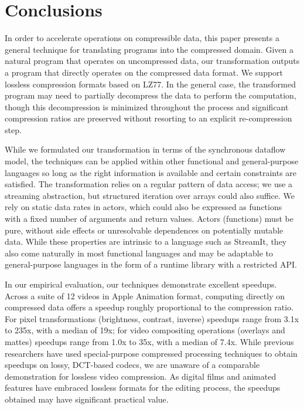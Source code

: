 \section{Conclusions}
\label{sec:conclusions}


In order to accelerate operations on compressible data, this paper
presents a general technique for translating programs into the
compressed domain.  Given a natural program that operates on
uncompressed data, our transformation outputs a program that directly
operates on the compressed data format.  We support lossless
compression formats based on LZ77.  In the general case, the
transformed program may need to partially decompress the data to
perform the computation, though this decompression is minimized
throughout the process and significant compression ratios are
preserved without resorting to an explicit re-compression step.

While we formulated our transformation in terms of the synchronous
dataflow model, the techniques can be applied within other functional
and general-purpose languages so long as the right information is
available and certain constraints are satisfied.  The transformation
relies on a regular pattern of data access; we use a streaming
abstraction, but structured iteration over arrays could also suffice.
We rely on static data rates in actors, which could also be expressed
as functions with a fixed number of arguments and return values.
Actors (functions) must be pure, without side effects or unresolvable
dependences on potentially mutable data.  While these properties are
intrinsic to a language such as StreamIt, they also come naturally in
most functional languages and may be adaptable to general-purpose
languages in the form of a runtime library with a restricted API.

In our empirical evaluation, our techniques demonstrate excellent
speedups.  Across a suite of 12 videos in Apple Animation format,
computing directly on compressed data offers a speedup roughly
proportional to the compression ratio.  For pixel transformations
(brightness, contrast, inverse) speedups range from 3.1x to 235x, with
a median of 19x; for video compositing operations (overlays and
mattes) speedups range from 1.0x to 35x, with a median of 7.4x.  While
previous researchers have used special-purpose compressed processing
techniques to obtain speedups on lossy, DCT-based codecs, we are
unaware of a comparable demonstration for lossless video compression.
As digital films and animated features have embraced lossless formats
for the editing process, the speedups obtained may have significant
practical value.

